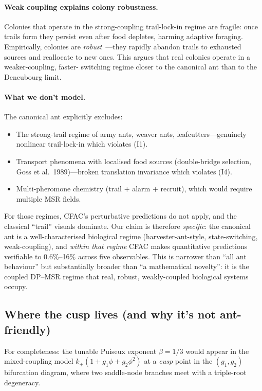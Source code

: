 \documentclass[10pt,a4paper,twocolumn]{article}
\theoremstyle{definition}
\begin{document}
\paragraph{Weak coupling explains colony robustness.}
Colonies that operate in the strong-coupling
trail-lock-in regime are fragile: once trails form they
persist even after food depletes, harming adaptive foraging.
Empirically, colonies are \emph{robust}~\citep{Gordon2010,
Pinter-Wollman2011}---they rapidly abandon trails to
exhausted sources and reallocate to new ones.  This argues
that real colonies operate in a weaker-coupling, faster-
switching regime closer to the canonical ant than to the
Deneubourg limit.

\paragraph{What we don't model.}
The canonical ant explicitly excludes:
\begin{itemize}
  \item The strong-trail regime of army ants, weaver ants,
    leafcutters---genuinely nonlinear trail-lock-in which
    violates (I1).
  \item Transport phenomena with localised food sources
    (double-bridge selection, Goss et al.\ 1989)---broken
    translation invariance which violates (I4).
  \item Multi-pheromone chemistry (trail $+$ alarm $+$ recruit),
    which would require multiple MSR fields.
\end{itemize}
For those regimes, CFAC's perturbative predictions do not
apply, and the classical ``trail'' visuals dominate.  Our
claim is therefore \emph{specific}: the canonical ant is a
well-characterised biological regime (harvester-ant-style,
state-switching, weak-coupling), and \emph{within that
regime} CFAC makes quantitative predictions verifiable to
0.6\%--16\% across five observables.  This is narrower than
``all ant behaviour'' but substantially broader than ``a
mathematical novelty'': it is the coupled DP--MSR regime that
real, robust, weakly-coupled biological systems occupy.

\subsection{Where the cusp lives (and why it's not ant-friendly)}
\label{sec:ant-cusp}

For completeness: the tunable Puiseux exponent $\beta = 1/3$
would appear in the mixed-coupling model
$k_+(1 + g_1\phi + g_2\phi^2)$ at a \emph{cusp} point in the
$(g_1, g_2)$ bifurcation diagram, where two saddle-node
branches meet with a triple-root degeneracy.
\end{document}
